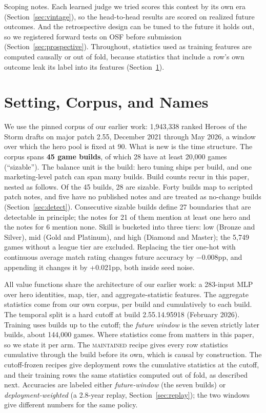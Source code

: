 \documentclass[journal]{IEEEtran}
\newcommand{\maintained}{\textsc{maintained}}          %
\begin{document}
Scoping notes. Each learned judge we tried scores this contest by
its own era (Section~\ref{sec:vintage}), so the head-to-head results are
scored on realized future outcomes. And the
retrospective design can be tuned to the future it holds out, so we
registered forward tests on OSF before submission
(Section~\ref{sec:prospective}). Throughout, statistics used as training
features are computed causally or out of fold, because statistics that
include a row's own outcome leak its label into its features
(Section~\ref{sec:setting}).

\section{Setting, Corpus, and Names}
\label{sec:setting}

We use the pinned corpus of our earlier work: 1{,}943{,}338 ranked
Heroes of the Storm drafts on major patch 2.55, December 2021 through May
2026, a window over which the hero pool is fixed at 90. What is new is
the time structure. The corpus spans \textbf{45 game builds}, of which 28
have at least 20{,}000 games (``sizable''). The balance unit is the
build: hero tuning ships per build, and one marketing-level patch can
span many builds. Build counts recur in this paper, nested as follows. Of the 45
builds, 28 are sizable. Forty builds map to scripted patch notes, and
five have no published notes and are treated as no-change builds
(Section~\ref{sec:detect}). Consecutive sizable builds define 27
boundaries that are detectable in principle; the notes for 21 of them
mention at least one hero and the notes for 6 mention none. Skill is
bucketed into three tiers: low (Bronze and Silver), mid (Gold and
Platinum), and high (Diamond and Master); the 5{,}749 games without a
league tier are excluded. Replacing the tier one-hot with continuous average match
rating changes future accuracy by $-$0.008pp, and appending it changes
it by +0.021pp, both inside seed noise.

All value functions share the architecture of our earlier work: a
283-input MLP over hero identities, map, tier, and aggregate-statistic
features. The aggregate statistics come from our own corpus, per build
and cumulatively to each build. The temporal split is a hard cutoff at
build 2.55.14.95918 (February 2026). Training uses builds up to the
cutoff; the \emph{future window} is the seven strictly later builds,
about 144{,}000 games. Where statistics come from matters in this paper,
so we state it per arm. The \maintained{} recipe gives every row
statistics cumulative through the build before its own, which is causal
by construction. The cutoff-frozen recipes give deployment rows the
cumulative statistics at the cutoff, and their training rows the same
statistics computed out of fold, as described next. Accuracies are
labeled either
\emph{future-window} (the seven builds) or \emph{deployment-weighted} (a
2.8-year replay, Section~\ref{sec:replay}); the two windows give
different numbers for the same policy.
\end{document}

